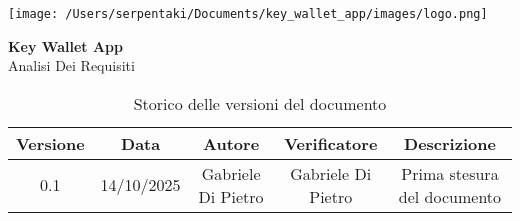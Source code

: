 \documentclass[a4paper,12pt]{article}
\begin{document}
\begin{titlepage}
    \thispagestyle{empty}

    \centering
    \vspace*{2cm}

    \texttt{[image: /Users/serpentaki/Documents/key\_wallet\_app/images/logo.png]}
    \vspace{1cm}

    {\Huge \textbf{Key Wallet App}}\\
    \vspace{0.5cm}
    {\Large Analisi Dei Requisiti}\\
    \vspace{4cm}
\end{titlepage}

\newpage
\begin{table}[h]
    \centering
    \renewcommand{\arraystretch}{1.2}
    \setlength{\tabcolsep}{5pt}
    \begin{tabular}{|c|c|c|c|c|}
        \hline
        \textbf{Versione} & \textbf{Data} & \textbf{Autore} & \textbf{Verificatore} & \textbf{Descrizione} \\
        \hline
        0.1 & 14/10/2025 & Gabriele Di Pietro & Gabriele Di Pietro & Prima stesura del documento \\
        \hline
    \end{tabular}
    \caption{Storico delle versioni del documento}
\end{table}

\newpage
\tableofcontents
\listoffigures
\listoftables

\newpage


\newpage


\newpage
%

\newpage
%
\end{document}
